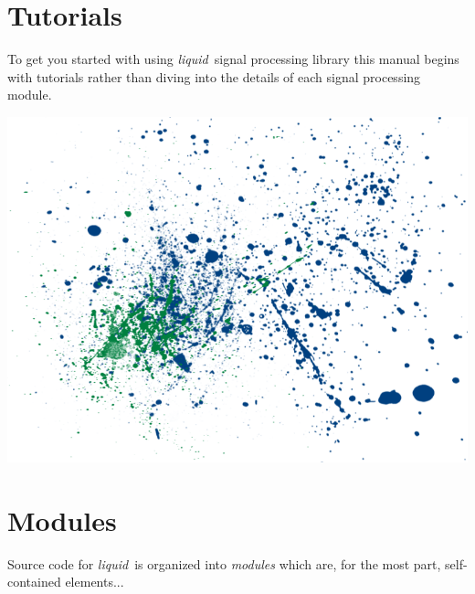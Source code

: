 \documentclass[11pt,twoside]{article}
\newcommand{\liquid}{{\it liquid}}
\begin{document}
\part{Tutorials}
\label{part:tutorials}

\bigskip
\noindent
To get you started with using \liquid\ signal processing library
this manual begins with tutorials rather than diving into the details of
each signal processing module.

\vfill

\includegraphics[width=\textwidth]{graphics/liquid_splatter_02.png}

\vfill



%



%
%
\newpage
\part{Modules}
\label{part:modules}

\bigskip
\noindent
Source code for \liquid\ is organized into {\em modules} which are, for
the most part, self-contained elements...

\vfill
\end{document}
